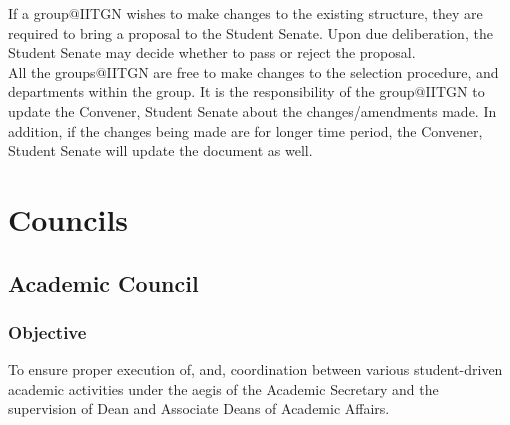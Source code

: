 \documentclass[12pt]{article}
\begin{document}
\noindent If a group$@$IITGN wishes to make changes to the existing structure, they are required to bring a proposal to the Student Senate. Upon due deliberation, the Student Senate may decide whether to pass or reject the proposal.\\

\noindent All the groups$@$IITGN are free to make changes to the selection procedure, and departments within the group. It is the responsibility of the group$@$IITGN to update the Convener, Student Senate about the changes/amendments made. In addition, if the changes being made are for longer time period, the Convener, Student Senate will update the document as well.


\newpage
\tableofcontents

\newpage


\section{Councils}

\subsection{Academic Council}

\subsubsection{Objective}
To ensure proper execution of, and, coordination between various
student-driven academic activities under the aegis of the Academic
Secretary and the supervision of Dean and Associate Deans of Academic
Affairs.
\end{document}
